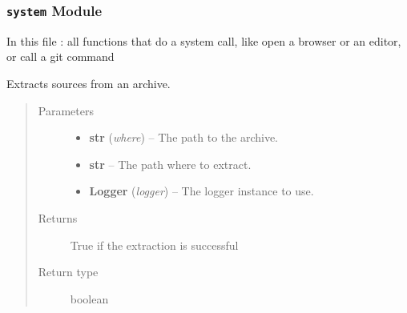 \documentclass[a4paper,10pt,english]{sphinxmanual}
\begin{document}
\subsubsection{\texttt{system} Module}
\label{commands/apidoc/src:system-module}\label{commands/apidoc/src:module-src.system}
In this file : all functions that do a system call, 
like open a browser or an editor, or call a git command

\begin{fulllineitems}
\label{commands/apidoc/src:src.system.archive_extract}
Extracts sources from an archive.
\begin{quote}\begin{description}
\item[{Parameters}] \leavevmode\begin{itemize}
\item {} 
\textbf{str} (\emph{where}) -- The path to the archive.

\item {} 
\textbf{str} -- The path where to extract.

\item {} 
\textbf{Logger} (\emph{logger}) -- The logger instance to use.

\end{itemize}

\item[{Returns}] \leavevmode
True if the extraction is successful

\item[{Return type}] \leavevmode
boolean

\end{description}\end{quote}

\end{fulllineitems}

\end{document}
